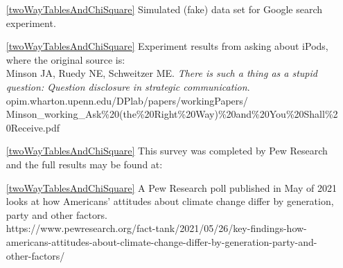 \begin{itemize}
\item[\ref{twoWayTablesAndChiSquare}]
    Simulated (fake) data set for Google search experiment.

\item[\ref{twoWayTablesAndChiSquare}]
    Experiment results from asking about iPods, where the original source is:\\
    Minson JA, Ruedy NE, Schweitzer ME.
    \emph{There is such a thing as a stupid question:
    Question disclosure in strategic communication}. \\
    {\small{}
        {opim.wharton.upenn.edu/DPlab/papers/workingPapers/}}\\
    {\small{}
        {Minson\_working\_Ask\%20(the\%20Right\%20Way)\%20and\%20You\%20Shall\%20Receive.pdf}}

\item[\ref{twoWayTablesAndChiSquare}]
    This survey was completed by Pew Research and the full results
    may be found at:\\
    {\scriptsize{}}


\item[\ref{twoWayTablesAndChiSquare}]
    A Pew Research poll published in May of 2021 looks at how Americans’
    attitudes about climate change differ by generation, party and other factors.\\
      {\scriptsize{https://www.pewresearch.org/fact-tank/2021/05/26/key-findings-how-americans-attitudes-about-climate-change-differ-by-generation-party-and-other-factors/}}

\end{itemize}








